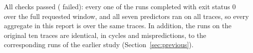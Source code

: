 All  checks passed ( failed): every one of the  runs completed with exit status 0 over the full requested window, and all seven predictors ran on all  traces, so every aggregate in this report is over the same  traces. In addition, the  runs on the original ten traces are identical, in cycles and mispredictions, to the corresponding runs of the earlier study (Section~\ref{sec:previous}).

